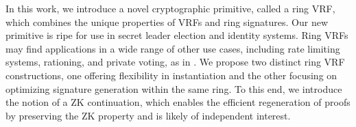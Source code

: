 In this work, we introduce a novel cryptographic primitive, called a ring VRF, which combines the unique properties of VRFs  and ring signatures. Our new primitive is ripe for use in secret leader election and identity systems.  Ring VRFs may find applications in a wide range of other use cases, including rate limiting systems, rationing, and private voting, as in \cite{Semaphore}. We propose two distinct ring VRF constructions, one offering flexibility in instantiation and the other focusing on optimizing signature generation within the same ring. To this end, we introduce the notion of a ZK continuation, which enables the efficient regeneration of proofs by preserving the ZK property and is likely of independent interest.

